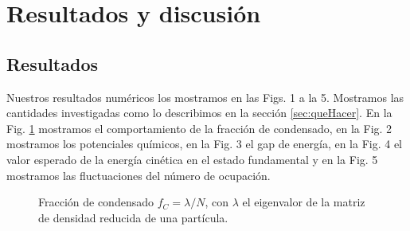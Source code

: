 \documentclass[11pt,letterpaper]{article}
\begin{document}
\section{Resultados y discusión}
\subsection{Resultados}
Nuestros resultados numéricos los mostramos en las Figs. 1 a la 5. 
Mostramos las cantidades investigadas como lo describimos 
en la sección \ref{sec:queHacer}. En la Fig. \ref{fig:condensate_fraction} 
mostramos el comportamiento de la fracción de condensado, en la Fig. 2 
mostramos los potenciales químicos, en la Fig. 3 el gap de energía, 
en la Fig. 4 el valor esperado de la energía cinética en el estado
fundamental y en la Fig. 5 mostramos las fluctuaciones del número
de ocupación.
\begin{figure}%
    \centering
    \caption{Fracción de condensado $f_C=\lambda/N$, con $\lambda$
    el eigenvalor de la matriz de densidad reducida de una partícula.}%
    \label{fig:condensate_fraction}%
\end{figure}
\end{document}
